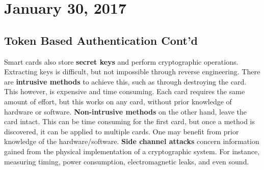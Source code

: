 \documentclass[11pt]{article}
\theoremstyle{plain} %
\theoremstyle{definition}
\theoremstyle{example}
\theoremstyle{remark}
\begin{document}
\section{January 30, 2017}
\subsection{Token Based Authentication Cont'd}

Smart cards also store \textbf{secret keys} and perform cryptographic operations. Extracting keys is difficult, but not impossible through reverse engineering. There are \textbf{intrusive methods} to achieve this, such as through destroying the card. This however, is expensive and time consuming. Each card requires the same amount of effort, but this works on any card, without prior knowledge of hardware or software. \textbf{Non-intrusive methods} on the other hand, leave the card intact. This can be time consuming for the first card, but once a method is discovered, it can be applied to multiple cards. One may benefit from prior knowledge of the hardware/software. \textbf{Side channel attacks} concern information gained from the physical implementation of a cryptographic system. For instance, measuring timing, power consumption, electromagnetic leaks, and even sound. 
\end{document}
